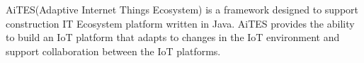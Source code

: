 Ai\+T\+E\+S(\+Adaptive Internet Things Ecosystem) is a framework designed to support construction IT Ecosystem platform written in Java. Ai\+T\+ES provides the ability to build an IoT platform that adapts to changes in the IoT environment and support collaboration between the IoT platforms. 